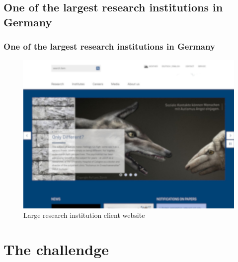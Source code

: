 \documentclass[aspectratio=169]{beamer}
\begin{document}
\subsection{One of the largest research institutions in Germany}
\begin{frame}
  \frametitle{One of the largest research institutions in Germany}
  \begin{figure}
    \includegraphics[height=.7\textheight]{./img/005_-_research_institution.jpg}
    \caption{Large research institution client website}
  \end{figure}
\end{frame}

\section{The challendge}
\end{document}
